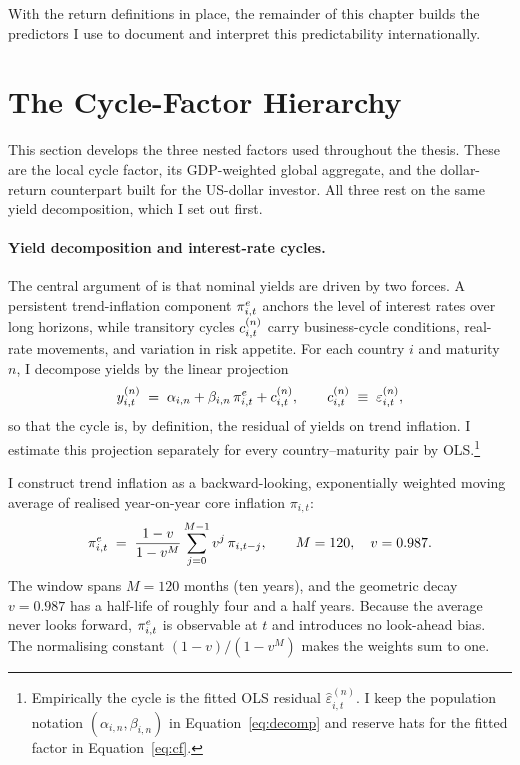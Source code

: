 With the return definitions in place, the remainder of this chapter builds the
predictors I use to document and interpret this predictability
internationally.

\section{The Cycle-Factor Hierarchy}
\label{sec:fw-hierarchy}

This section develops the three nested factors used throughout the thesis.
These are the local cycle factor, its GDP-weighted global aggregate, and the
dollar-return counterpart built for the US-dollar investor. All three rest on the same
yield decomposition, which I set out first.

\paragraph{Yield decomposition and interest-rate cycles.}
The central argument of \citet{cieslak2015} is that nominal yields are driven by
two forces. A persistent trend-inflation component
$\pi^{e}_{i,t}$ anchors the level of interest rates over long horizons,
while transitory cycles $c^{(n)}_{i,t}$ carry
business-cycle conditions, real-rate movements, and variation in risk
appetite. For each country $i$ and maturity $n$, I decompose yields by the
linear projection
\begin{equation}
  y^{(n)}_{i,t} \;=\; \alpha_{i,n} + \beta_{i,n}\,\pi^{e}_{i,t}
                    + c^{(n)}_{i,t},
  \qquad
  c^{(n)}_{i,t} \;\equiv\; \varepsilon^{(n)}_{i,t},
  \label{eq:decomp}
\end{equation}
so that the cycle is, by definition, the residual of yields on trend inflation.
I estimate this projection separately for every country--maturity pair by
OLS.\footnote{Empirically the cycle is the fitted OLS
  residual $\hat\varepsilon^{(n)}_{i,t}$. I keep the population notation
  $(\alpha_{i,n},\beta_{i,n})$ in Equation~\eqref{eq:decomp} and reserve hats for the
  fitted factor in Equation~\eqref{eq:cf}.}

I construct trend inflation as a backward-looking, exponentially weighted
moving average of realised year-on-year core inflation $\pi_{i,t}$:
\begin{equation}
  \pi^{e}_{i,t} \;=\; \frac{1-v}{1-v^{M}}\sum_{j=0}^{M-1} v^{j}\,\pi_{i,t-j},
  \qquad M=120,\quad v=0.987.
  \label{eq:trendinf}
\end{equation}
The window spans $M=120$ months (ten years), and the geometric decay
$v=0.987$ has a half-life of roughly four and a half years.
Because the average never looks forward, $\pi^{e}_{i,t}$ is observable at $t$
and introduces no look-ahead bias. The normalising constant $(1-v)/(1-v^{M})$
makes the weights sum to one.

